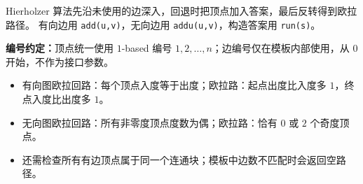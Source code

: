 Hierholzer 算法先沿未使用的边深入，回退时把顶点加入答案，最后反转得到欧拉路径。
有向边用 \texttt{add(u,v)}，无向边用 \texttt{addu(u,v)}，构造答案用 \texttt{run(s)}。

\textbf{编号约定：}顶点统一使用 $1$-based 编号 $1,2,\ldots,n$；边编号仅在模板内部使用，从 $0$ 开始，不作为接口参数。

\begin{itemize}
  \item 有向图欧拉回路：每个顶点入度等于出度；欧拉路：起点出度比入度多 $1$，终点入度比出度多 $1$。
  \item 无向图欧拉回路：所有非零度顶点度数为偶；欧拉路：恰有 $0$ 或 $2$ 个奇度顶点。
  \item 还需检查所有有边顶点属于同一个连通块；模板中边数不匹配时会返回空路径。
\end{itemize}
